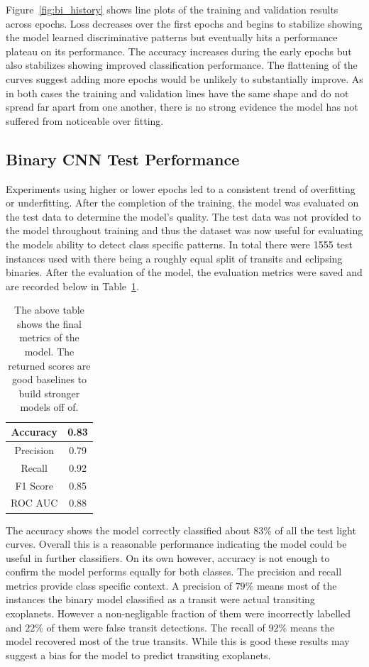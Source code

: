 Figure~\ref{fig:bi_history} shows line plots of the training and validation results across epochs. Loss decreases over the first epochs and begins to stabilize showing the model learned discriminative patterns but eventually hits a performance plateau on its performance. The accuracy increases during the early epochs but also stabilizes showing improved classification performance. The flattening of the curves suggest adding more epochs would be unlikely to substantially improve. As in both cases the training and validation lines have the same shape and do not spread far apart from one another, there is no strong evidence the model has not suffered from noticeable over fitting. 


\subsection{Binary CNN Test Performance}

Experiments using higher or lower epochs led to a consistent trend of overfitting or underfitting. After the completion of the training, the model was evaluated on the test data to determine the model's quality. The test data was not provided to the model throughout training and thus the dataset was now useful for evaluating the models ability to detect class specific patterns. In total there were 1555 test instances used with there being a roughly equal split of transits and eclipsing binaries. After the evaluation of the model, the evaluation metrics were saved and are recorded below in Table~\ref{tab:metrics_table}. 

\begin{table}[H]
    \centering
    \begin{tabular}{c|c}
        Accuracy & 0.83 \\ \hline
        Precision & 0.79 \\ \hline
        Recall & 0.92\\ \hline
        F1 Score & 0.85\\ \hline
        ROC AUC & 0.88
    \end{tabular}
    \caption{The above table shows the final metrics of the model. The returned scores are good baselines to build stronger models off of.}
    \label{tab:metrics_table}
\end{table}

The accuracy shows the model correctly classified about $83\%$ of all the test light curves. Overall this is a reasonable performance indicating the model could be useful in further classifiers. On its own however, accuracy is not enough to confirm the model performs equally for both classes. The precision and recall metrics provide class specific context. A precision of $79\%$ means most of the instances the binary model classified as a transit were actual transiting exoplanets. However a non-negligable fraction of them were incorrectly labelled and $22\%$ of them were false transit detections. The recall of $92\%$ means the model recovered most of the true transits. While this is good these results may suggest a bias for the model to predict transiting exoplanets. 

